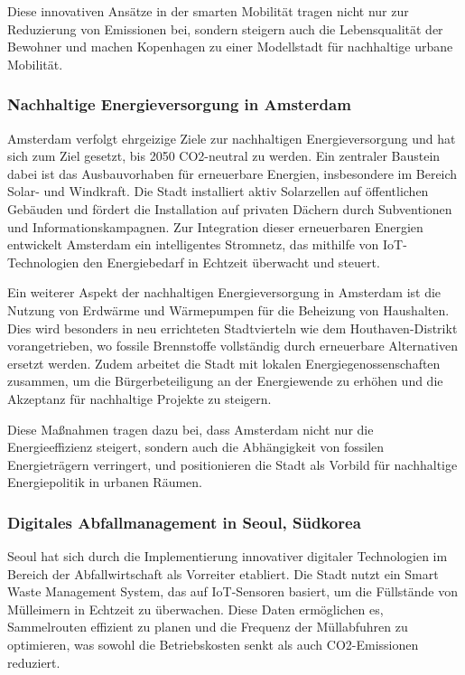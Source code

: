 \documentclass[conference,compsoc,final,a4paper, onecolumn, 11pt]{IEEEtran}
\begin{document}
Diese innovativen Ansätze in der smarten Mobilität tragen nicht nur zur Reduzierung von Emissionen bei, sondern steigern auch die Lebensqualität der Bewohner und machen Kopenhagen zu einer Modellstadt für nachhaltige urbane Mobilität. \autocite{andreaseisenring_grune_2021}


\subsubsection{Nachhaltige Energieversorgung in Amsterdam}
Amsterdam verfolgt ehrgeizige Ziele zur nachhaltigen Energieversorgung und hat sich zum Ziel gesetzt, bis 2050 CO2-neutral zu werden. 
Ein zentraler Baustein dabei ist das Ausbauvorhaben für erneuerbare Energien, insbesondere im Bereich Solar- und Windkraft. 
Die Stadt installiert aktiv Solarzellen auf öffentlichen Gebäuden und fördert die Installation auf privaten Dächern durch Subventionen und Informationskampagnen. \autocite{noauthor_solar_nodate}
Zur Integration dieser erneuerbaren Energien entwickelt Amsterdam ein intelligentes Stromnetz, das mithilfe von IoT-Technologien den Energiebedarf in Echtzeit überwacht und steuert. \autocite{noauthor_solar_nodate}

Ein weiterer Aspekt der nachhaltigen Energieversorgung in Amsterdam ist die Nutzung von Erdwärme und Wärmepumpen für die Beheizung von Haushalten. 
Dies wird besonders in neu errichteten Stadtvierteln wie dem Houthaven-Distrikt vorangetrieben, wo fossile Brennstoffe vollständig durch erneuerbare Alternativen ersetzt werden. \autocite{noauthor_solar_nodate}
Zudem arbeitet die Stadt mit lokalen Energiegenossenschaften zusammen, um die Bürgerbeteiligung an der Energiewende zu erhöhen und die Akzeptanz für nachhaltige Projekte zu steigern. \autocite{noauthor_solar_nodate}

Diese Maßnahmen tragen dazu bei, dass Amsterdam nicht nur die Energieeffizienz steigert, sondern auch die Abhängigkeit von fossilen Energieträgern verringert, und positionieren die Stadt als Vorbild für nachhaltige Energiepolitik in urbanen Räumen.


\subsubsection{Digitales Abfallmanagement in Seoul, Südkorea}
Seoul hat sich durch die Implementierung innovativer digitaler Technologien im Bereich der Abfallwirtschaft als Vorreiter etabliert. 
Die Stadt nutzt ein Smart Waste Management System, das auf IoT-Sensoren basiert, um die Füllstände von Mülleimern in Echtzeit zu überwachen. 
Diese Daten ermöglichen es, Sammelrouten effizient zu planen und die Frequenz der Müllabfuhren zu optimieren, was sowohl die Betriebskosten senkt als auch CO2-Emissionen reduziert. \autocite{noauthor_dem_nodate}
\end{document}
